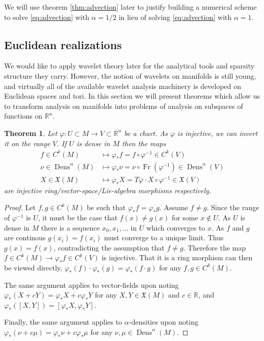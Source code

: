 \documentclass[a4paper, 12 pt]{amsart}
\newcommand{\R}{\mathbb{R}}
\newtheorem{thm}{Theorem}[section]
\DeclareMathOperator{\Fr}{Fr}
\DeclareMathOperator{\Dens}{Dens}
\begin{document}
  We will use theorem \ref{thm:advection} later to justify building
  a numerical scheme to solve \eqref{eq:advection} with $\alpha = 1/2$
  in lieu of solving \eqref{eq:advection} with $\alpha = 1$.

\subsection{Euclidean realizations}
\label{sec:euclidean}
  We would like to apply wavelet theory later for the
  analytical tools and sparsity structure they carry.
  However, the notion of wavelets on manifolds is still young,
  and virtually all of the available wavelet analysis machinery
  is developed on Euclidean spaces and tori.
  In this section we will present theorems which allow
  us to transform analysis on manifolds into problems
  of analysis on subspaces of functions on $\R^n$.

\begin{thm}
  \label{thm:Euclidean}
  Let $\varphi:U \subset M \to V \subset \R^n$ be a chart.
  As $\varphi$ is injective, we can invert it on the range $V$.
  If $U$ is dense in $M$ then the maps
  \begin{align*}
    f \in C^k(M) &\mapsto \varphi_*f = f \circ \varphi^{-1} \in C^k(V) \\
    \nu \in \Dens^\alpha(M) &\mapsto \varphi_* \nu = \nu \circ \Fr(\varphi^{-1}) \in \Dens^\alpha(V) \\
    X \in \mathfrak{X}(M) &\mapsto \varphi_* X = T\varphi \cdot X \circ \varphi^{-1} \in \mathfrak{X}(V)
  \end{align*}
  are injective ring/vector-space/Lie-algebra morphisms respectively.
  \end{thm}
  \begin{proof}
    Let $f,g \in C^k(M)$ be such that $\varphi_* f = \varphi_*g$.
    Assume $f \neq g$.
    Since the range of $\varphi^{-1}$ is $U$, it must be the case that
    $f(x) \neq g(x)$ for some $x \notin U$.
    As $U$ is dense in $M$ there is a sequence $x_0,x_1,\dots$ in $U$
    which converges to $x$.
    As $f$ and $g$ are continous $g(x_i) = f(x_i)$ must converge to a
    unique limit.  Thus $g(x) = f(x)$, contradicting the assumption
    that $f \neq g$.
    Therefore the map $f \in C^k(M) \to \varphi_* f \in C^k(V)$
    is injective.
    That it is a ring morphism can then be viewed directly, $\varphi_*(f) \cdot \varphi_*(g) = \varphi_*(f \cdot g)$ for any $f,g \in C^k(M)$.
    
    The same argument applies to vector-fields
    upon noting $\varphi_*(X+cY) = \varphi_*X + c \varphi_*Y$ for any $X,Y \in \mathfrak{X}(M)$ and $c \in \R$, and $\varphi_*([X,Y]) = [\varphi_*X, \varphi_*Y]$.

    Finally, the same argument applies to $\alpha$-densities
    upon noting $\varphi_*( \nu + c \mu) = \varphi_*\nu + c \varphi_* \mu$ for any $\nu,\mu \in \Dens^\alpha(M)$.
  \end{proof}
  
\end{document}
